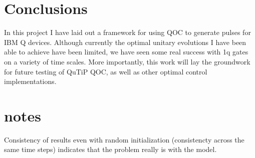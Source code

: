 \documentclass[12pt]{article}
\begin{document}
\section{Conclusions}\label{conclusions}

In this project I have laid out a framework for using QOC to generate pulses for
IBM Q devices. Although currently the optimal unitary evolutions I have been
able to achieve have been limited, we have seen some real success with 1q gates
on a variety of time scales. More importantly, this work will lay the groundwork
for future testing of QuTiP QOC, as well as other optimal control
implementations.

\section{notes}

Consistency of results even with random initialization (consistencty across the
same time steps) indicates that the problem really is with the model.


\end{document}
